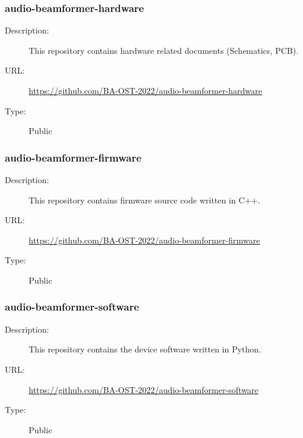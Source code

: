 \subsubsection{audio-beamformer-hardware} \vspace{-0.2cm}
\begin{description}
  \item[Description:] This repository contains hardware related documents (Schematics, PCB).\vspace{-0.25cm}
  \item[URL:] \url{https://github.com/BA-OST-2022/audio-beamformer-hardware}\vspace{-0.25cm}
  \item[Type:] Public\vspace{-0.25cm}
\end{description}

\subsubsection{audio-beamformer-firmware} \vspace{-0.2cm}
\begin{description}
  \item[Description:] This repository contains firmware source code written in C++.\vspace{-0.25cm}
  \item[URL:] \url{https://github.com/BA-OST-2022/audio-beamformer-firmware}\vspace{-0.25cm}
  \item[Type:] Public\vspace{-0.25cm}
\end{description}

\subsubsection{audio-beamformer-software} \vspace{-0.2cm}
\begin{description}
  \item[Description:] This repository contains the device software written in Python.\vspace{-0.25cm}
  \item[URL:] \url{https://github.com/BA-OST-2022/audio-beamformer-software}\vspace{-0.25cm}
  \item[Type:] Public\vspace{-0.25cm}
\end{description}

